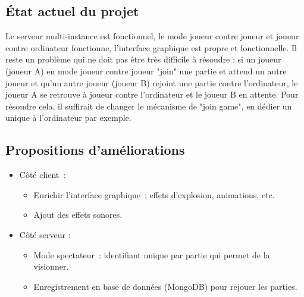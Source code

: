 \documentclass[a4paper, 11pt]{article}
\begin{document}
\subsection{État actuel du projet}
Le serveur multi-instance est fonctionnel, le mode joueur contre joueur et joueur contre ordinateur fonctionne, l'interface graphique est propre et fonctionnelle. Il reste un problème qui ne doit pas être très difficile à résoudre : si un joueur (joueur A) en mode joueur contre joueur "join" une partie et attend un autre joueur et qu'un autre joueur (joueur B) rejoint une partie contre l'ordinateur, le joueur A se retrouve à joueur contre l'ordinateur et le joueur B en attente. Pour résoudre cela, il suffirait de changer le mécanisme de "join game", en dédier un unique à l'ordinateur par exemple.
\subsection{Propositions d'améliorations}
\begin{itemize}
	\item Côté client :
	\begin{itemize}
		\item Enrichir l’interface graphique : effets d’explosion, animations, etc.
		\item Ajout des effets sonores.
	\end{itemize}
	\item Côté serveur :
	\begin{itemize}
		\item Mode spectateur : identifiant unique par partie qui permet de la visionner.
		\item Enregistrement en base de données (MongoDB) pour rejouer les parties.
	\end{itemize}
\end{itemize}
\end{document}
